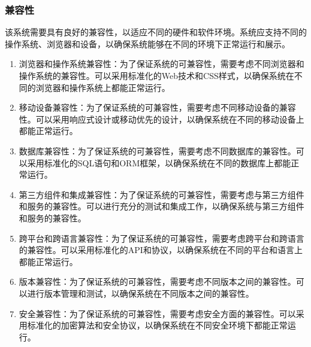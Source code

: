 \documentclass[UTF8]{ctexart}
\newcommand{\m}[1]{\textcolor{modify}{#1}}
\begin{document}
    \subsubsection{兼容性}
    该系统需要具有良好的兼容性，以适应不同的硬件和软件环境。系统应支持不同的操作系统、浏览器和设备，以确保系统能够在不同的环境下正常运行和展示。
    \m{
        \begin{enumerate}
            \item 浏览器和操作系统兼容性：为了保证系统的可兼容性，需要考虑不同浏览器和操作系统的兼容性。可以采用标准化的Web技术和CSS样式，以确保系统在不同的浏览器和操作系统上都能正常运行。
            \item 移动设备兼容性：为了保证系统的可兼容性，需要考虑不同移动设备的兼容性。可以采用响应式设计或移动优先的设计，以确保系统在不同的移动设备上都能正常运行。
            \item 数据库兼容性：为了保证系统的可兼容性，需要考虑不同数据库的兼容性。可以采用标准化的SQL语句和ORM框架，以确保系统在不同的数据库上都能正常运行。
            \item 第三方组件和集成兼容性：为了保证系统的可兼容性，需要考虑与第三方组件和服务的兼容性。可以进行充分的测试和集成工作，以确保系统与第三方组件和服务的兼容性。
            \item 跨平台和跨语言兼容性：为了保证系统的可兼容性，需要考虑跨平台和跨语言的兼容性。可以采用标准化的API和协议，以确保系统在不同的平台和语言上都能正常运行。
            \item 版本兼容性：为了保证系统的可兼容性，需要考虑不同版本之间的兼容性。可以进行版本管理和测试，以确保系统在不同版本之间的兼容性。
            \item 安全兼容性：为了保证系统的可兼容性，需要考虑安全方面的兼容性。可以采用标准化的加密算法和安全协议，以确保系统在不同安全环境下都能正常运行。
        \end{enumerate}
    }
\end{document}
